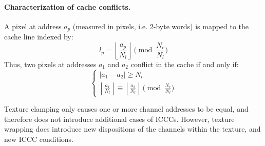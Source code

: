 \documentclass[a4paper,11pt]{kthesis}
\begin{document}
\paragraph{Characterization of cache conflicts.} A pixel at address $a_{p}$ (measured in pixels, i.e. 2-byte words) is mapped to the cache line indexed by:
\begin{equation}
l_{p} = \left\lfloor \frac{a_{p}}{N_{l}} \right\rfloor \pmod{\frac{N_{c}}{N_{l}}}
\end{equation}
Thus, two pixels at addresses $a_{1}$ and $a_{2}$ conflict in the cache if and only if:
\begin{equation}\label{eq:cacheconflict}
\begin{cases}
|a_{1}-a_{2}| \geq N_{l} \\
\left\lfloor \frac{a_{1}}{N_{l}} \right\rfloor \equiv \left\lfloor \frac{a_{2}}{N_{l}} \right\rfloor \pmod{\frac{N_{c}}{N_{l}}}
\end{cases}
\end{equation}

Texture clamping only causes one or more channel addresses to be equal, and therefore does not introduce additional cases of ICCCs. However, texture wrapping does introduce new dispositions of the channels within the texture, and new ICCC conditions.
\end{document}
